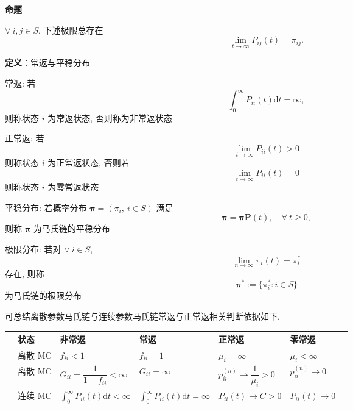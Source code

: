 \documentclass[openany]{ctexbook}
\theoremstyle{kaiti}
\theoremstyle{normal}
\begin{document}
\textbf{命题}

$\forall~i,j\in S$, 下述极限总存在
\begin{equation}
  \lim_{t\to\infty}P_{ij}(t)=\pi_{ij}.
\end{equation}

\textbf{定义}：常返与平稳分布

常返: 若
\begin{equation}
  \int_0^\infty P_{ii}(t)\mathrm{d}t=\infty,
\end{equation} 则称状态 $i$ 为常返状态, 否则称为非常返状态

正常返: 若
\begin{equation}
  \lim_{t\to\infty}P_{ii}(t)>0
\end{equation} 则称状态 $i$ 为正常返状态, 否则若
\begin{equation}
  \lim_{t\to\infty}P_{ii}(t)=0
\end{equation} 则称状态 $i$ 为零常返状态

平稳分布: 若概率分布 $\bm{\pi}=(\pi_i,~i\in S)$ 满足
\begin{equation}
  \bm{\pi}=\bm{\pi}\bm{P}(t),\quad\forall~t\geqslant0,
\end{equation} 则称 $\bm{\pi}$ 为马氏链的平稳分布

极限分布: 若对 $\forall~i\in S$, 
\begin{equation}
  \lim_{n\to\infty}\pi_i(t)=\pi_i^*
\end{equation} 存在, 则称
\begin{equation}
  \bm{\pi}^*:=\{\pi_i^*:i\in S\}
\end{equation} 为马氏链的极限分布

可总结离散参数马氏链与连续参数马氏链常返与正常返相关判断依据如下.

\begin{table}[ht]
  \renewcommand\arraystretch{1.5}
  \begin{tabular}{lllllll}
  \hline
   & 状态    & 非常返                                                      & 常返                                                       & 正常返                                 & 零常返                &  \\
   \hline
   & 离散 MC & $f_{ii}<1$                                               & $f_{ii}=1$                                               & $\mu_i=\infty$                      & $\mu_i<\infty$     &  \\
   & 离散 MC & $G_{ii}=\dfrac{1}{1-f_{ii}}<\infty$                      & $G_{ii}=\infty$                                          & $p_{ii}^{(n)}\to\dfrac{1}{\mu_i}>0$ & $p_{ii}^{(n)}\to0$ &  \\
   & 连续 MC & $\displaystyle\int_0^\infty P_{ii}(t)\mathrm{d}t<\infty$ & $\displaystyle\int_0^\infty P_{ii}(t)\mathrm{d}t=\infty$ & $P_{ii}(t)\to C>0$                  & $P_{ii}(t)\to0$    & \\
   \hline
  \end{tabular}
\end{table}
\end{document}
